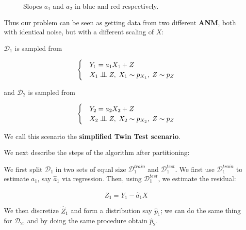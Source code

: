 \begin{figure}[!h]
    \centering
      \caption{Slopes $a_1$ and $a_2$ in blue and red respectively.}
\end{figure}

Thus our problem can be seen as getting data from two different \textbf{ANM}, both with identical noise, but with 
a different scaling of $X$:

$\mathcal{D}_1$ is sampled from 

\[ \begin{cases} 
    & Y_1 = a_1 X_1 + Z  \\
    & X_1 \bigCI Z,\; X_1 \thicksim p_{X_1},\; Z \thicksim p_{Z}  
 \end{cases}
\]

and $\mathcal{D}_2$ is sampled from 

\[ \begin{cases} 
    & Y_2 = a_2 X_2 + Z  \\
    & X_2 \bigCI Z,\; X_2 \thicksim p_{X_2},\; Z \thicksim p_{Z}  
 \end{cases}
\]


We call this scenario the \textbf{simplified Twin Test scenario}. 

We next describe the steps of the algorithm after partitioning:

We first split $\mathcal{D}_1$ in two sets of equal size $\mathcal{D}_{1}^{train}$ and 
$\mathcal{D}_{1}^{test}$. We first use $\mathcal{D}_{1}^{train}$ to estimate $a_1$, say $\hat{a}_1$ via 
regression. Then, using $\mathcal{D}_{1}^{test}$, we estimate the residual:

$$
    \hat{Z}_1 = Y_1 - \hat{a}_1 X
$$

We then discretize $\hat{Z}_1$ and form a distribution say $\hat{p}_1$; we can do the same thing for 
$\mathcal{D}_2$, and by doing the same procedure obtain $\hat{p}_2$.

